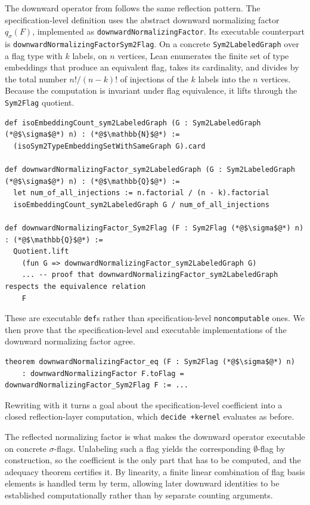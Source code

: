 \documentclass[acmsmall,screen=true,acmthm=false]{acmart}
\DeclareRobustCommand{\lean}[1]{{\def\_{\textunderscore\allowbreak}\texttt{#1}}}
\begin{document}
The downward operator from  follows the same
reflection pattern.  The specification-level definition uses the abstract
downward normalizing factor \(q_\sigma(F)\), implemented as
\lean{downwardNormalizingFactor}.  Its executable counterpart is
\lean{downwardNormalizingFactor\_Sym2Flag}.  On a concrete
\lean{Sym2LabeledGraph} over a flag type with \(k\) labels, on \(n\) vertices,
Lean enumerates the finite set of type embeddings that
produce an equivalent flag, takes its cardinality, and divides by the total
number \(n!/(n-k)!\) of injections of the \(k\) labels into the \(n\) vertices.
Because the computation is invariant under flag equivalence, it lifts through
the \lean{Sym2Flag} quotient.
\begin{lstlisting}
def isoEmbeddingCount_sym2LabeledGraph (G : Sym2LabeledGraph (*@$\sigma$@*) n) : (*@$\mathbb{N}$@*) :=
  (isoSym2TypeEmbeddingSetWithSameGraph G).card

def downwardNormalizingFactor_sym2LabeledGraph (G : Sym2LabeledGraph (*@$\sigma$@*) n) : (*@$\mathbb{Q}$@*) :=
  let num_of_all_injections := n.factorial / (n - k).factorial
  isoEmbeddingCount_sym2LabeledGraph G / num_of_all_injections

def downwardNormalizingFactor_Sym2Flag (F : Sym2Flag (*@$\sigma$@*) n) : (*@$\mathbb{Q}$@*) :=
  Quotient.lift
    (fun G => downwardNormalizingFactor_sym2LabeledGraph G)
    ... -- proof that downwardNormalizingFactor_sym2LabeledGraph respects the equivalence relation
    F
\end{lstlisting}
These are executable \lean{def}s rather than specification-level
\lean{noncomputable} ones.  We then prove that the specification-level and
executable implementations of the downward normalizing factor agree.
\begin{lstlisting}
theorem downwardNormalizingFactor_eq (F : Sym2Flag (*@$\sigma$@*) n)
    : downwardNormalizingFactor F.toFlag = downwardNormalizingFactor_Sym2Flag F := ...
\end{lstlisting}
Rewriting with it turns a goal about the specification-level coefficient into a
closed reflection-layer computation, which \lean{decide +kernel} evaluates as
before.

The reflected normalizing factor is what makes the downward operator executable
on concrete $\sigma$-flags.  Unlabeling such a flag yields the corresponding
$\emptyset$-flag by construction, so the coefficient is the only part that has
to be computed, and the adequacy theorem certifies
it.  By linearity, a finite linear combination of flag basis
elements is handled term by term, allowing later downward identities to be
established computationally rather than by separate counting arguments.
\end{document}
